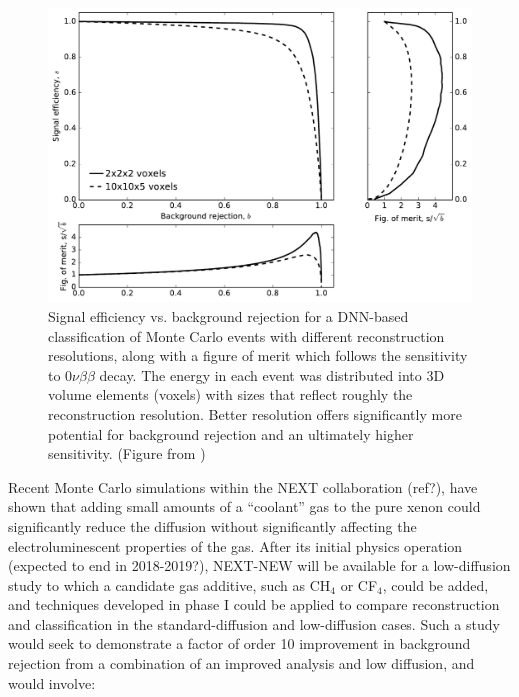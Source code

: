 \documentclass[11pt,a4paper]{article}
\begin{document}
\begin{figure}[!htb]
	\centering
	\includegraphics[scale=0.5]{fig/sigvsbg_DNN.pdf}
	\caption{\label{fig.svsbDNN}Signal efficiency vs. background rejection for a DNN-based classification of Monte Carlo events with different reconstruction resolutions, along with a figure of merit which follows the sensitivity to $0\nu\beta\beta$ decay. The energy in each event was distributed into 3D volume elements (voxels) with sizes that reflect roughly the reconstruction resolution. Better resolution offers significantly more potential for background rejection and an ultimately higher sensitivity. (Figure from \cite{NEXT_DNN})}
\end{figure}

Recent Monte Carlo simulations within the NEXT collaboration (ref?), have shown that adding small amounts of a ``coolant'' gas to the pure xenon could significantly reduce the diffusion without significantly affecting the electroluminescent properties of the gas. After its initial physics operation (expected to end in 2018-2019?), NEXT-NEW will be available for a low-diffusion study to which a candidate gas additive, such as CH$_4$ or CF$_4$, could be added, and techniques developed in phase I could be applied to compare reconstruction and classification in the standard-diffusion and low-diffusion cases. Such a study would seek to demonstrate a factor of order 10 improvement in background rejection from a combination of an improved analysis and low diffusion, and would involve:
\end{document}
